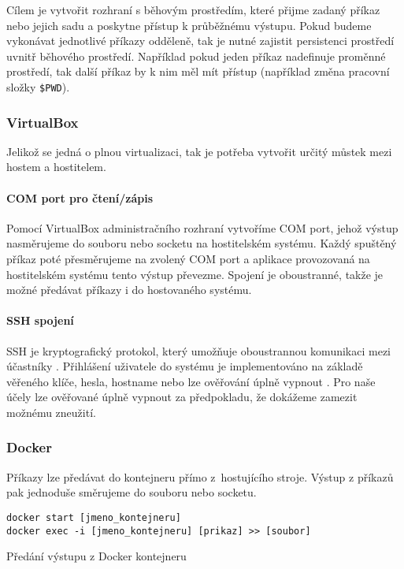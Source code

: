 Cílem je vytvořit rozhraní s běhovým prostředím, které přijme zadaný příkaz nebo jejich sadu a poskytne přístup k průběžnému výstupu.
Pokud budeme vykonávat jednotlivé příkazy odděleně, tak je nutné zajistit persistenci prostředí uvnitř běhového prostředí.
Například pokud jeden příkaz nadefinuje proměnné prostředí, tak další příkaz by k nim měl mít přístup (například změna pracovní složky \verb|$PWD|).

\subsubsection{VirtualBox}

Jelikož se jedná o plnou virtualizaci, tak je potřeba vytvořit určitý můstek mezi hostem a hostitelem.

\paragraph{COM port pro čtení/zápis}

Pomocí VirtualBox administračního rozhraní vytvoříme COM port, jehož výstup nasměrujeme do souboru nebo socketu na hostitelském systému.
Každý spuštěný příkaz poté přesměrujeme na zvolený COM port a aplikace provozovaná na hostitelském systému tento výstup převezme.
Spojení je oboustranné, takže je možné předávat příkazy i do hostovaného systému.
\cite{virtualbox_serial}

\paragraph{SSH spojení}

SSH je kryptografický protokol, který umožňuje oboustrannou komunikaci mezi účastníky \cite{ssh_rfc}.
Přihlášení uživatele do systému je implementováno na základě věřeného klíče, hesla, hostname nebo lze ověřování úplně vypnout \cite{ssh_auth_rfc}.
Pro naše účely lze ověřované úplně vypnout za předpokladu, že dokážeme zamezit možnému zneužití.

\subsubsection{Docker}

Příkazy lze předávat do kontejneru přímo z~hostujícího stroje.
Výstup z příkazů pak jednoduše směrujeme do souboru nebo socketu.

\begin{listing}[ht]
\begin{verbatim}
docker start [jmeno_kontejneru]
docker exec -i [jmeno_kontejneru] [prikaz] >> [soubor]
\end{verbatim}
\caption{Předání výstupu z Docker kontejneru}
\end{listing}


